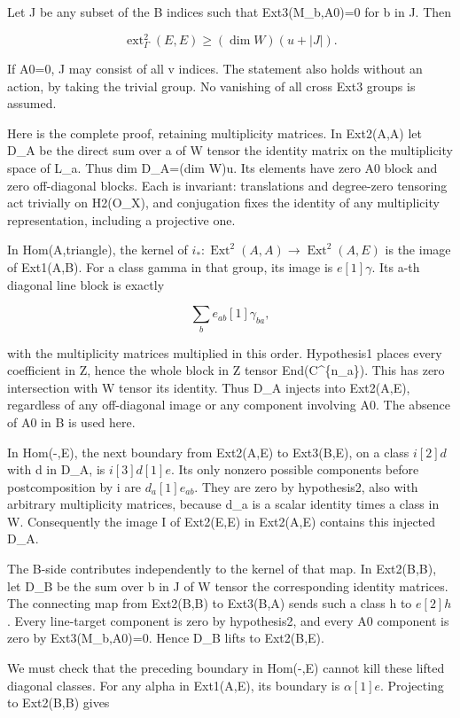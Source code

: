 Let J be any subset of the B indices such that Ext3(M\_b,A0)=0 for b in J.
Then

\[
 \operatorname{ext}^2_\Gamma(E,E)\ge(\dim W)(u+|J|).
 \tag{E827.2}
\]

If A0=0, J may consist of all v indices. The statement also holds without an
action, by taking the trivial group. No vanishing of all cross Ext3 groups
is assumed.

Here is the complete proof, retaining multiplicity matrices. In Ext2(A,A)
let D\_A be the direct sum over a of W tensor the identity matrix on the
multiplicity space of L\_a. Thus dim D\_A=(dim W)u. Its elements have zero
A0 block and zero off-diagonal blocks. Each is invariant: translations and
degree-zero tensoring act trivially on H2(O\_X), and conjugation fixes the
identity of any multiplicity representation, including a projective one.

In Hom(A,triangle), the kernel of
\(i_*:\operatorname{Ext}^2(A,A)\to\operatorname{Ext}^2(A,E)\) is the image
of Ext1(A,B). For a class gamma in that group, its image is \(e[1]\gamma\).
Its a-th diagonal line block is exactly

\[
 \sum_b e_{ab}[1]\gamma_{ba},
 \tag{E827.3}
\]

with the multiplicity matrices multiplied in this order. Hypothesis1 places
every coefficient in Z, hence the whole block in Z tensor
End(C\^{}\{n\_a\}). This has zero intersection with W tensor its identity.
Thus D\_A injects into Ext2(A,E), regardless of any off-diagonal image or
any component involving A0. The absence of A0 in B is used here.

In Hom(-,E), the next boundary from Ext2(A,E) to Ext3(B,E), on a class
\(i[2]d\) with d in D\_A, is \(i[3]d[1]e\). Its only nonzero possible
components before postcomposition by i are \(d_a[1]e_{ab}\). They are zero
by hypothesis2, also with arbitrary multiplicity matrices, because d\_a is a
scalar identity times a class in W. Consequently the image I of Ext2(E,E) in
Ext2(A,E) contains this injected D\_A.

The B-side contributes independently to the kernel of that map. In
Ext2(B,B), let D\_B be the sum over b in J of W tensor the corresponding
identity matrices. The connecting map from Ext2(B,B) to Ext3(B,A) sends such
a class h to \(e[2]h\). Every line-target component is zero by hypothesis2,
and every A0 component is zero by Ext3(M\_b,A0)=0. Hence D\_B lifts to
Ext2(B,E).

We must check that the preceding boundary in Hom(-,E) cannot kill these
lifted diagonal classes. For any alpha in Ext1(A,E), its boundary is
\(\alpha[1]e\). Projecting to Ext2(B,B) gives

